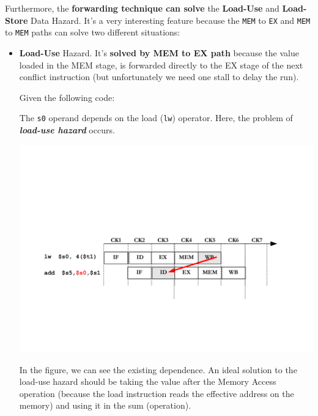 \noindent
Furthermore, the \textbf{forwarding technique can solve} the \textbf{Load-Use} and \textbf{Load-Store} Data Hazard. It's a very interesting feature because the \texttt{MEM} to \texttt{EX} and \texttt{MEM} to \texttt{MEM} paths can solve two different situations:
\begin{itemize}
    \item \textbf{Load-Use} Hazard. It's \textbf{solved by MEM to EX path} because the value loaded in the MEM stage, is forwarded directly to the EX stage of the next conflict instruction (but unfortunately we need one stall to delay the run).

    \begin{examplebox}
        Given the following code:
        
        The \texttt{s0} operand depends on the load (\texttt{lw}) operator. Here, the problem of \textbf{\emph{load-use hazard}} occurs.
        \begin{center}
            \includegraphics[width=\textwidth]{img/load-use-hazard-problem-1.pdf}
        \end{center}
        In the figure, we can see the existing dependence. An ideal solution to the load-use hazard should be taking the value after the Memory Access operation (because the load instruction reads the effective address on the memory) and using it in the sum (operation).


\end{examplebox}
\end{itemize}
